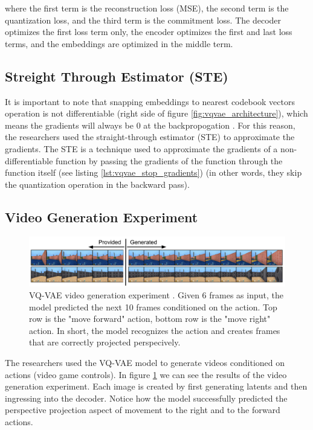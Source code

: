     where the first term is the reconstruction loss (MSE), the second term is the quantization loss, and the third term is the commitment loss. The decoder optimizes the first loss term only, the encoder optimizes the first and last loss terms, and the embeddings are optimized in the middle term.






\subsection{Streight Through Estimator (STE)}
\label{subsec:vqvae_ste}

It is important to note that snapping embeddings to nearest codebook vectors operation is not differentiable (right side of figure \ref{fig:vqvae_architecture}), which means the gradients will always be 0 at the backpropogation \cite{why_round_function_is_not_differentiable}. For this reason, the researchers used the straight-through estimator (STE) to approximate the gradients. The STE is a technique used to approximate the gradients of a non-differentiable function by passing the gradients of the function through the function itself (see listing \ref{lst:vqvae_stop_gradients}) (in other words, they skip the quantization operation in the backward pass).

\subsection{Video Generation Experiment}


\begin{figure}[h]
    \centering
    \includegraphics[width=\textwidth]{images/vqvae_video_generation.png}
    \caption{VQ-VAE video generation experiment \cite{vqvae}. Given 6 frames as input, the model predicted the next 10 frames conditioned on the action. Top row is the "move forward" action, bottom row is the "move right" action. In short, the model recognizes the action and creates frames that are correctly projected perspecively.}
    \label{fig:vqvae_video_generation}
\end{figure}

The researchers used the VQ-VAE model to generate videos conditioned on actions (video game controls). In figure \ref{fig:vqvae_video_generation} we can see the results of the video generation experiment. Each image is created by first generating latents and then ingressing into the decoder. Notice how the model successfully predicted the perspective projection aspect of movement to the right and to the forward actions.
